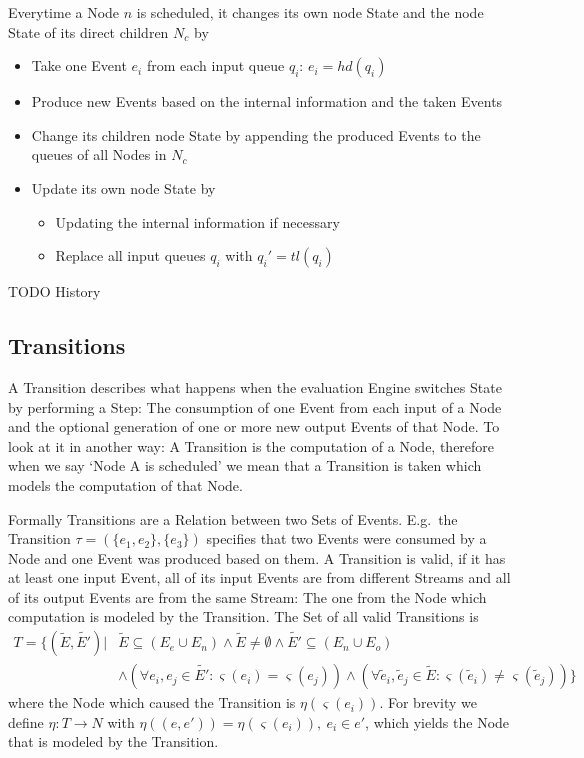 Everytime a Node \(n\) is scheduled, it changes its own node State and the node State of its direct children \(N_c\) by

\begin{itemize}
  \item Take one Event \(e_i\) from each input queue \(q_i\): \(e_i = hd(q_i)\)
  \item Produce new Events based on the internal information and the taken Events
  \item Change its children node State by appending the produced Events to the queues of all Nodes in \(N_c\)
  \item Update its own node State by
  \begin{itemize}
    \item Updating the internal information if necessary
    \item Replace all input queues \(q_i\) with \(q_i' = tl(q_i)\)
  \end{itemize}
\end{itemize}

TODO History

\subsection{Transitions}
\label{sec:concepts:def:transitions}

A Transition describes what happens when the evaluation Engine switches State by performing a Step:
The consumption of one Event from each input of a Node and the optional generation of one or more new output Events of that Node.
To look at it in another way: A Transition is the computation of a Node, therefore when we say `Node A is scheduled' we mean that a Transition is taken which models the computation of that Node.

Formally Transitions are a Relation between two Sets of Events.
E.g.\ the Transition \(\tau = (\{e_1,e_2\}, \{e_3\})\) specifies that two Events were consumed by a Node and one Event was produced based on them.
A Transition is valid, if it has at least one input Event, all of its input Events are from different Streams and all of its output Events are from the same Stream: The one from the Node which computation is modeled by the Transition.
The Set of all valid Transitions is
\begin{align*}
  T = \{(\widetilde{E}, \widetilde{E'}) | &\widetilde{E} \subseteq (E_e \cup E_n) \land \widetilde{E} \neq \emptyset \land \widetilde{E'} \subseteq (E_n \cup E_o)\\
&\land (\forall e_i, e_j \in \widetilde{E'}: \varsigma(e_i) = \varsigma(e_j)) \land (\forall \widetilde{e}_i, \widetilde{e}_j \in \widetilde{E}: \varsigma(\widetilde{e}_i) \neq \varsigma(\widetilde{e}_j))\}
\end{align*}
where the Node which caused the Transition is \(\eta(\varsigma(e_i))\).
For brevity we define \(\eta : T \rightarrow N\) with \(\eta((e, e')) = \eta(\varsigma(e_i)),\ e_i \in e'\), which yields the Node that is modeled by the Transition.

